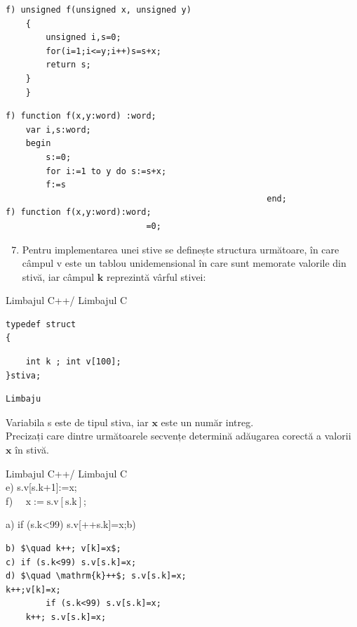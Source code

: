 \documentclass[10pt]{article}
\begin{document}
\begin{verbatim}
f) unsigned f(unsigned x, unsigned y)
    {
        unsigned i,s=0;
        for(i=1;i<=y;i++)s=s+x;
        return s;
    }
    }
\end{verbatim}

\begin{verbatim}
f) function f(x,y:word) :word;
    var i,s:word;
    begin
        s:=0;
        for i:=1 to y do s:=s+x;
        f:=s
                                                    end;
f) function f(x,y:word):word;
                            =0;
\end{verbatim}

\begin{enumerate}
  \setcounter{enumi}{6}
  \item Pentru implementarea unei stive se definește structura următoare, în care câmpul v este un tablou unidemensional în care sunt memorate valorile din stivă, iar câmpul $\mathbf{k}$ reprezintă vârful stivei:
\end{enumerate}

Limbajul C++/ Limbajul C

\begin{verbatim}
typedef struct
{
\end{verbatim}

\begin{verbatim}
    int k ; int v[100];
}stiva;
\end{verbatim}

\begin{verbatim}
Limbaju
\end{verbatim}

Variabila s este de tipul stiva, iar $\mathbf{x}$ este un număr intreg.\\
Precizați care dintre următoarele secvențe determină adăugarea corectă a valorii $\mathbf{x}$ în stivă.

Limbajul C++/ Limbajul C\\[0pt]
e) s.v[s.k+1]:=x;\\
f) $\quad \mathrm{x}:=\mathrm{s} . \mathrm{v}[\mathrm{s} . \mathrm{k}]$;

a) if (s.k<99) s.v[++s.k]=x;b)

\begin{verbatim}
b) $\quad k++; v[k]=x$;
c) if (s.k<99) s.v[s.k]=x;
d) $\quad \mathrm{k}++$; s.v[s.k]=x;
k++;v[k]=x;
        if (s.k<99) s.v[s.k]=x;
    k++; s.v[s.k]=x;
\end{verbatim}
\end{document}
